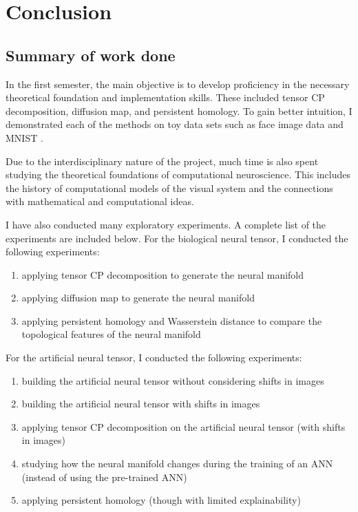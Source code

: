 \chapter{Conclusion}
\label{chapter-conclusion} 

\section{Summary of work done}

In the first semester, the main objective is to develop proficiency in the necessary theoretical foundation and implementation skills. These included tensor CP decomposition, diffusion map, and persistent homology. To gain better intuition, I demonstrated each of the methods on toy data sets such as face image data and MNIST \cite{mnist}. 

Due to the interdisciplinary nature of the project, much time is also spent studying the theoretical foundations of computational neuroscience. This includes the history of computational models of the visual system and the connections with mathematical and computational ideas. 

I have also conducted many exploratory experiments. A complete list of the experiments are included below.
For the biological neural tensor, I conducted the following experiments:
\begin{enumerate}
    \item applying tensor CP decomposition to generate the neural manifold
    \item applying diffusion map to generate the neural manifold
    \item applying persistent homology and Wasserstein distance to compare the topological features of the neural manifold
\end{enumerate}

For the artificial neural tensor, I conducted the following experiments:
\begin{enumerate}
    \item building the artificial neural tensor without considering shifts in images
    \item building the artificial neural tensor with shifts in images
    \item applying tensor CP decomposition on the artificial neural tensor (with shifts in images)
    \item studying how the neural manifold changes during the training of an ANN (instead of using the pre-trained ANN)
    \item applying persistent homology (though with limited explainability)
\end{enumerate}

